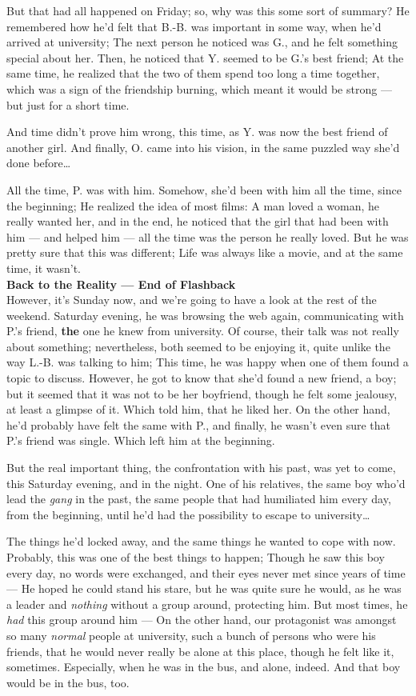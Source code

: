 But that had all happened on Friday; so, why was this some sort of summary?
He remembered how he'd felt that B.-B. was important in some way, when he'd arrived at university; The next person he noticed was G., and he felt something special about her. Then, he noticed that Y. seemed to be G.'s best friend; At the same time, he realized that the two of them spend too long a time together, which was a sign of the friendship burning, which meant it would be strong --- but just for a short time.

And time didn't prove him wrong, this time, as Y. was now the best friend of another girl. 
And finally, O. came into his vision, in the same puzzled way she'd done before\ldots

All the time, P. was with him. Somehow, she'd been with him all the time, since the beginning; He realized the idea of most films: A man loved a woman, he really wanted her, and in the end, he noticed that the girl that had been with him --- and helped him --- all the time was the person he really loved. 
But he was pretty sure that this was different; Life was always like a movie, and at the same time, it wasn't.\\
\textbf{Back to the Reality --- End of Flashback}\\
However, it's Sunday now, and we're going to have a look at the rest of the weekend. Saturday evening, he was browsing the web again, communicating with P.'s friend, \textbf{the} one he knew from university. Of course, their talk was not really about something; nevertheless, both seemed to be enjoying it, quite unlike the way L.-B. was talking to him; This time, he was happy when one of them found a topic to discuss. However, he got to know that she'd found a new friend, a boy; but it seemed that it was not to be her boyfriend, though he felt some jealousy, at least a glimpse of it. Which told him, that he liked her. On the other hand, he'd probably have felt the same with P., and finally, he wasn't even sure that P.'s friend was single. 
Which left him at the beginning.

But the real important thing, the confrontation with his past, was yet to come, this Saturday evening, and in the night. One of his relatives, the same boy who'd lead the \emph{gang} in the past, the same people that had humiliated him every day, from the beginning, until he'd had the possibility to escape to university\ldots

The things he'd locked away, and the same things he wanted to cope with now. Probably, this was one of the best things to happen; Though he saw this boy every day, no words were exchanged, and their eyes never met since years of time --- He hoped he could stand his stare, but he was quite sure he would, as he was a leader and \emph{nothing} without a group around, protecting him. 
But most times, he \emph{had} this group around him --- On the other hand, our protagonist was amongst so many \emph{normal} people at university, such a bunch of persons who were his friends, that he would never really be alone at this place, though he felt like it, sometimes. 
Especially, when he was in the bus, and alone, indeed. 
And that boy would be in the bus, too.

